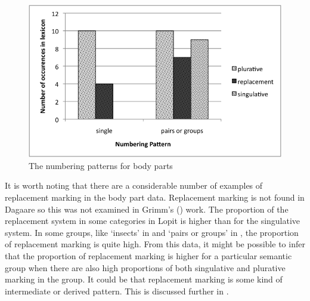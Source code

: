 \documentclass[output=paper]{langsci/langscibook}
\begin{document}
\begin{figure}
\includegraphics[width=\textwidth]{figures/moodie-fig-2.png}
\caption{The numbering patterns for body parts}
\label{fig:moodie:2}
\end{figure}

It is worth noting that there are a considerable number of examples of replacement marking in the body part data. Replacement marking is not found in Dagaare so this was not examined in Grimm’s (\citeyear{Grimm2012}) work. The proportion of the replacement system in some categories in Lopit is higher than for the singulative system.  In some groups, like ‘insects’ in  and  ‘pairs or groups’ in , the proportion of replacement marking is quite high. From this data, it might be possible to infer that the proportion of replacement marking is higher for a particular semantic group when there are also high proportions of both singulative and plurative marking in the group. It could be that replacement marking is some kind of intermediate or derived pattern.  This is discussed further in .
\end{document}
